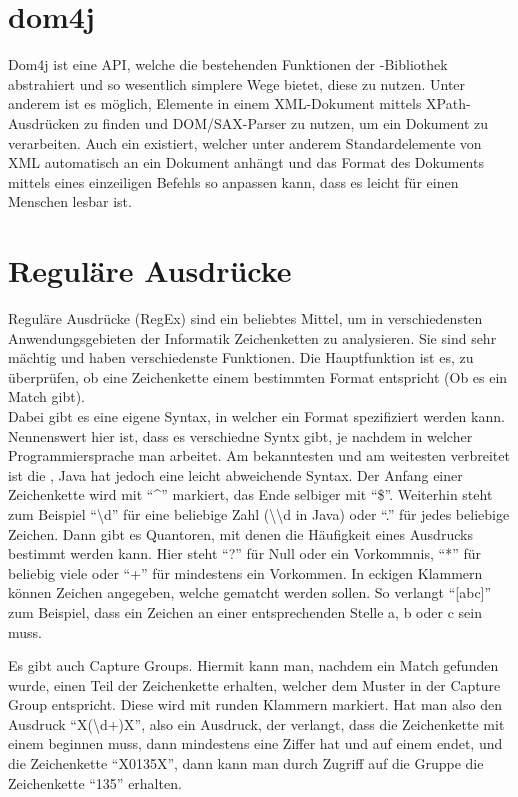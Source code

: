 \section{dom4j}

Dom4j ist eine API, welche die bestehenden Funktionen der -Bibliothek abstrahiert und so wesentlich simplere Wege bietet, diese zu nutzen.
Unter anderem ist es möglich, Elemente in einem XML-Dokument mittels XPath-Ausdrücken zu finden und DOM/SAX-Parser zu nutzen, um ein Dokument zu verarbeiten.
Auch ein  existiert, welcher unter anderem Standardelemente von XML automatisch an ein Dokument anhängt und das Format des Dokuments mittels eines einzeiligen Befehls so anpassen kann, dass es leicht für einen Menschen lesbar ist.

\section{Reguläre Ausdrücke}

Reguläre Ausdrücke (RegEx) sind ein beliebtes Mittel, um in verschiedensten Anwendungsgebieten der Informatik Zeichenketten zu analysieren.
Sie sind sehr mächtig und haben verschiedenste Funktionen.
Die Hauptfunktion ist es, zu überprüfen, ob eine Zeichenkette einem bestimmten Format entspricht (Ob es ein Match gibt).\\

Dabei gibt es eine eigene Syntax, in welcher ein Format spezifiziert werden kann.
Nennenswert hier ist, dass es verschiedne Syntx gibt, je nachdem in welcher Programmiersprache man arbeitet.
Am bekanntesten und am weitesten verbreitet ist die , Java hat jedoch eine leicht abweichende Syntax.
Der Anfang einer Zeichenkette wird mit \enquote{\textasciicircum} markiert, das Ende selbiger mit \enquote{\$}.
Weiterhin steht zum Beispiel \enquote{\textbackslash d} für eine beliebige Zahl (\textbackslash\textbackslash d in Java) oder \enquote{.} für jedes beliebige Zeichen.
Dann gibt es Quantoren, mit denen die Häufigkeit eines Ausdrucks bestimmt werden kann.
Hier steht \enquote{?} für Null oder ein Vorkommnis, \enquote{*} für beliebig viele oder \enquote{+} für mindestens ein Vorkommen.
In eckigen Klammern können Zeichen angegeben, welche gematcht werden sollen. So verlangt \enquote{[abc]} zum Beispiel, dass ein Zeichen an einer entsprechenden Stelle a, b oder c sein muss.

Es gibt auch Capture Groups. Hiermit kann man, nachdem ein Match gefunden wurde, einen Teil der Zeichenkette erhalten, welcher dem Muster in der Capture Group entspricht. Diese wird mit runden Klammern markiert.
Hat man also den Ausdruck \enquote{X(\textbackslash d+)X}, also ein Ausdruck, der verlangt, dass die Zeichenkette mit einem  beginnen muss, dann mindestens eine Ziffer hat und auf einem  endet, und die Zeichenkette \enquote{X0135X}, dann kann man durch Zugriff auf die Gruppe die Zeichenkette \enquote{135} erhalten.
